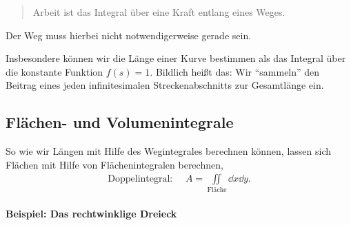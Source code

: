 \begin{quote}
    Arbeit ist das Integral über eine Kraft entlang eines Weges.
\end{quote}
Der Weg muss hierbei nicht notwendigerweise gerade sein. 
\begin{figure}[htp]
    \centering
\end{figure}
Insbesondere können wir die Länge einer Kurve bestimmen als das Integral über die konstante Funktion $f(s) = 1$. Bildlich heißt das: Wir ``sammeln'' den Beitrag eines jeden infinitesimalen Streckenabschnitts zur Gesamtlänge ein.

\subsection{Flächen- und Volumenintegrale}

So wie wir Längen mit Hilfe des Wegintegrales berechnen können, lassen sich Flächen mit Hilfe von Flächenintegralen berechnen, 
\begin{align}
    \text{Doppelintegral: } \quad A = \iint\limits_{\text{Fläche}} \dd{x}\dd{y}. 
\end{align}

\paragraph{Beispiel: Das rechtwinklige Dreieck}$~$

